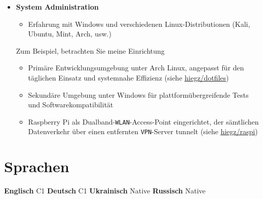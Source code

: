\documentclass[]{article}
\begin{document}
\begin{minipage}[t]{0.49\linewidth}
    \begin{itemize}[leftmargin=0.15in, rightmargin=0.15in, label={}]
        \item {\large\bfseries System Administration}

            \begin{itemize}
                \item Erfahrung mit Windows und verschiedenen Linux-Distributionen (Kali, Ubuntu, Mint, Arch, usw.)
            \end{itemize}

            \hspace{5pt}
            Zum Beispiel, betrachten Sie meine Einrichtung

            \begin{itemize}
                \item Primäre Entwicklungsumgebung unter Arch Linux, angepasst für den täglichen Einsatz und systemnahe Effizienz
                    (siehe \href{https://github.com/hiegz/dotfiles}{\ttfamily \underline{hiegz/dotfiles}})
                \item Sekundäre Umgebung unter Windows für plattformübergreifende Tests und Softwarekompatibilität
                \item Raspberry Pi als Dualband-\verb|WLAN|-Access-Point eingerichtet,
                    der sämtlichen Datenverkehr über einen entfernten \verb|VPN|-Server tunnelt
                    (siehe \href{https://github.com/hiegz/raspi}{\ttfamily \underline{hiegz/raspi}})
            \end{itemize}
    \end{itemize}
\end{minipage}

\vspace{5pt}
\section{Sprachen}

\hspace{0.15in}
\textbf{Englisch} \: C1 \hspace{20pt} \textbf{Deutsch} \: C1 \hspace{20pt} \textbf{Ukrainisch} \: Native \hspace{20pt} \textbf{Russisch} \: Native
\end{document}
